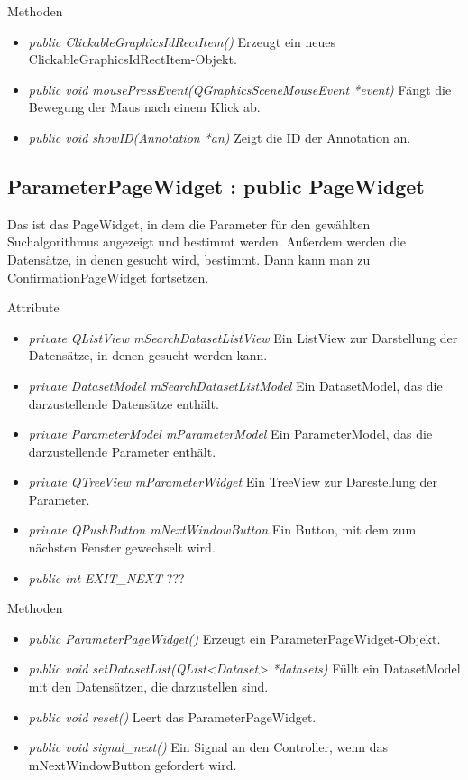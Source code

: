 Methoden
\begin{itemize}
	\item\textit{public ClickableGraphicsIdRectItem()}
	Erzeugt ein neues ClickableGraphicsIdRectItem-Objekt.
	\item\textit{public void mousePressEvent(QGraphicsSceneMouseEvent *event)}
	Fängt die Bewegung der Maus nach einem Klick ab.
	\item\textit{public void showID(Annotation *an)}
	Zeigt die ID der Annotation an.
\end{itemize}

\subsection*{ParameterPageWidget : public PageWidget}
Das ist das PageWidget, in dem die Parameter für den gewählten Suchalgorithmus angezeigt und bestimmt werden. Außerdem werden die Datensätze, in denen gesucht wird, bestimmt. Dann kann man zu ConfirmationPageWidget fortsetzen.

Attribute
\begin{itemize}
	\item\textit{private QListView mSearchDatasetListView}
	Ein ListView zur Darstellung der Datensätze, in denen gesucht werden kann.
	\item\textit{private DatasetModel mSearchDatasetListModel}
	Ein DatasetModel, das die darzustellende Datensätze enthält.
	\item\textit{private ParameterModel mParameterModel}
	Ein ParameterModel, das die darzustellende Parameter enthält.
	\item\textit{private QTreeView mParameterWidget}
	Ein TreeView zur Darestellung der Parameter.
	\item\textit{private QPushButton mNextWindowButton}
	Ein Button, mit dem zum nächsten Fenster gewechselt wird.
	\item\textit{public int EXIT\_NEXT} 
	???    
\end{itemize}

Methoden
\begin{itemize}
	\item\textit{public ParameterPageWidget()}
	Erzeugt ein ParameterPageWidget-Objekt.
	\item\textit{public void setDatasetList(QList<Dataset> *datasets)}
	Füllt ein DatasetModel mit den Datensätzen, die darzustellen sind.
	\item\textit{public void reset()}
	Leert das ParameterPageWidget.
	\item\textit{public void signal\_next()}
	Ein Signal an den Controller, wenn das mNextWindowButton gefordert wird. 
\end{itemize}


